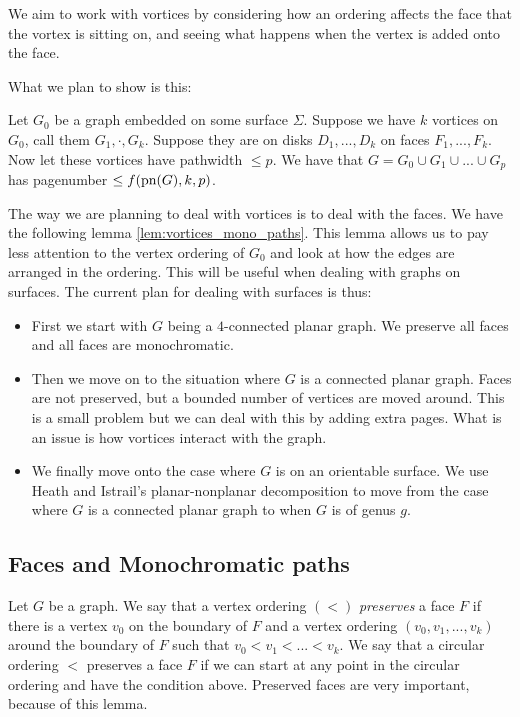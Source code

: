 We aim to work with vortices by considering how an ordering affects the face that the vortex is sitting on, and seeing what happens when the vertex is added onto the face.

What we plan to show is this:
\begin{conjecture}
	Let $G_0$ be a graph embedded on some surface $\Sigma$. Suppose we have $k$ vortices on $G_0$, call them $G_1, \cdot , G_k$. Suppose they are on disks $D_1, ..., D_k$ on faces $F_1, ..., F_k$. Now let these vortices have pathwidth $\leq p$. 
	We have that $G = G_0 \cup G_1 \cup ... \cup G_p$ has pagenumber $\leq f(\text{pn}(G), k, p)$.
\end{conjecture}
The way we are planning to deal with vortices is to deal with the faces. We have the following lemma \cref{lem:vortices_mono_paths}. This lemma allows us to pay less attention to the vertex ordering of $G_0$ and look at how the edges are arranged in the ordering. This will be useful when dealing with graphs on surfaces.
The current plan for dealing with surfaces is thus:
\begin{itemize}
	\item First we start with $G$ being a $4$-connected planar graph. We preserve all faces and all faces are monochromatic.
	\item Then we move on to the situation where $G$ is a connected planar graph. Faces are not preserved, but a bounded number of vertices are moved around. This is a small problem but we can deal with this by adding extra pages. What is an issue is how vortices interact with the graph. 
	\item We finally move onto the case where $G$ is on an orientable surface. We use Heath and Istrail's \cite{heathPagenumberGenusGraphs1992} planar-nonplanar decomposition to move from the case where $G$ is a connected planar graph to when $G$ is of genus $g$. 
\end{itemize}

\subsection{Faces and Monochromatic paths}
Let $G$ be a graph. We say that a vertex ordering $(<)$ \textit{preserves} a face $F$ if there is a vertex $v_0$ on the boundary of $F$ and a vertex ordering $(v_0, v_1, ..., v_k)$ around the boundary of $F$ such that $v_0 < v_1 < ... < v_k$. We say that a circular ordering $<$ preserves a face $F$ if we can start at any point in the circular ordering and have the condition above. 
Preserved faces are very important, because of this lemma.


